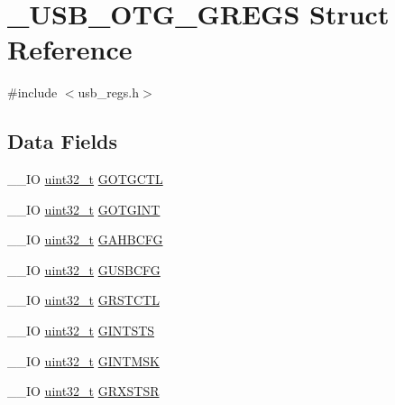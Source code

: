 \hypertarget{struct___u_s_b___o_t_g___g_r_e_g_s}{\section{\-\_\-\-U\-S\-B\-\_\-\-O\-T\-G\-\_\-\-G\-R\-E\-G\-S Struct Reference}
\label{struct___u_s_b___o_t_g___g_r_e_g_s}
}


{\ttfamily \#include $<$usb\-\_\-regs.\-h$>$}

\subsection*{Data Fields}
\begin{DoxyCompactItemize}
\item 
\-\_\-\-\_\-\-I\-O \hyperlink{stdint_8h_a435d1572bf3f880d55459d9805097f62}{uint32\-\_\-t} \hyperlink{group___u_s_b___o_t_g___d_r_i_v_e_r_ga6fb89e8b4dd062729b74e8786592e545}{G\-O\-T\-G\-C\-T\-L}
\item 
\-\_\-\-\_\-\-I\-O \hyperlink{stdint_8h_a435d1572bf3f880d55459d9805097f62}{uint32\-\_\-t} \hyperlink{group___u_s_b___o_t_g___d_r_i_v_e_r_ga12c69f2304e2bb34c0972bb4f13c7ba3}{G\-O\-T\-G\-I\-N\-T}
\item 
\-\_\-\-\_\-\-I\-O \hyperlink{stdint_8h_a435d1572bf3f880d55459d9805097f62}{uint32\-\_\-t} \hyperlink{group___u_s_b___o_t_g___d_r_i_v_e_r_ga06c4430bf0ae0fb15f7bb958aea887fd}{G\-A\-H\-B\-C\-F\-G}
\item 
\-\_\-\-\_\-\-I\-O \hyperlink{stdint_8h_a435d1572bf3f880d55459d9805097f62}{uint32\-\_\-t} \hyperlink{group___u_s_b___o_t_g___d_r_i_v_e_r_ga9685dd6f94efe8f30a49ce1ffca59481}{G\-U\-S\-B\-C\-F\-G}
\item 
\-\_\-\-\_\-\-I\-O \hyperlink{stdint_8h_a435d1572bf3f880d55459d9805097f62}{uint32\-\_\-t} \hyperlink{group___u_s_b___o_t_g___d_r_i_v_e_r_ga3770b3b36182131eb65631fb5ca071bf}{G\-R\-S\-T\-C\-T\-L}
\item 
\-\_\-\-\_\-\-I\-O \hyperlink{stdint_8h_a435d1572bf3f880d55459d9805097f62}{uint32\-\_\-t} \hyperlink{group___u_s_b___o_t_g___d_r_i_v_e_r_ga55882277285fb2848a0598d078890834}{G\-I\-N\-T\-S\-T\-S}
\item 
\-\_\-\-\_\-\-I\-O \hyperlink{stdint_8h_a435d1572bf3f880d55459d9805097f62}{uint32\-\_\-t} \hyperlink{group___u_s_b___o_t_g___d_r_i_v_e_r_ga6f14e249d3ef50307a23c4ddc7f12368}{G\-I\-N\-T\-M\-S\-K}
\item 
\-\_\-\-\_\-\-I\-O \hyperlink{stdint_8h_a435d1572bf3f880d55459d9805097f62}{uint32\-\_\-t} \hyperlink{group___u_s_b___o_t_g___d_r_i_v_e_r_ga4407ec0a1191e4409afca7f4725db8fd}{G\-R\-X\-S\-T\-S\-R}

\end{DoxyCompactItemize}
